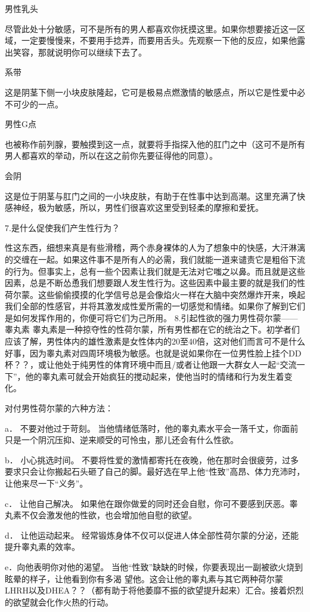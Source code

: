 \documentclass[12pt,UTF8]{ctexbook}
\begin{document}
男性乳头

尽管此处十分敏感，可不是所有的男人都喜欢你抚摸这里。如果你想要接近这一区域，一定要慢慢来，不要用手捻弄，而要用舌头。先观察一下他的反应，如果他露出笑容，那就说明你可以继续下去了。

系带

这是阴茎下侧一小块皮肤隆起，它可是极易点燃激情的敏感点，所以它是性爱中必不可少的一点。

男性G点

也被称作前列腺，要触摸到这一点，就要将手指探入他的肛门之中（这可不是所有男人都喜欢的举动，所以在这之前你先要征得他的同意）。

会阴

这是位于阴茎与肛门之间的一小块皮肤，有助于在性事中达到高潮。这里充满了快感神经，极为敏感，所以，男性们很喜欢这里受到轻柔的摩擦和爱抚。

7.是什么促使我们产生性行为？

性这东西，细想来真是有些滑稽，两个赤身裸体的人为了想象中的快感，大汗淋漓的交缠在一起。如果这件事不是所有人的必需，我们就能一道来谴责它是粗俗下流的行为。但事实上，总有一些个因素让我们就是无法对它嗤之以鼻。而且就是这些因素，总是不断怂恿我们想要跟人发生性行为。这些因素中最主要的就是我们的性荷尔蒙。这些偷偷摸摸的化学信号总是会像焰火一样在大脑中突然爆炸开来，唤起我们全部的性感官，并将其激发成性爱所需的一切感觉和情绪。如果你了解到它们是如何发挥作用的，你便可将它们为己所用。
8.引起性欲的强力男性荷尔蒙——睾丸素
睾丸素是一种掠夺性的性荷尔蒙，所有男性都在它的统治之下。初学者们应该了解，男性体内的雄性激素是女性体内的20至40倍，这对他们而言可不是什么好事，因为睾丸素对四周环境极为敏感。也就是说如果你在一位男性脸上挂个DD杯？？，或让他处于纯男性的体育环境中而且/或者让他跟一大群女人一起“交流一下”，他的睾丸素可就会开始疯狂的搅动起来，使他当时的情绪和行为发生着变化。

对付男性荷尔蒙的六种方法：

a． 不要对他过于苛刻。
当他情绪低落时，他的睾丸素水平会一落千丈，你面前只是一个阴沉压抑、逆来顺受的可怜虫，那儿还会有什么性欲。

b． 小心挑选时间。
不要将性爱的激情都寄托在夜晚，他在那时会很疲劳，过多要求只会让你搬起石头砸了自己的脚。最好选在早上他“性致”高昂、体力充沛时，让他来尽一下“义务”。

c． 让他自己解决。
如果他在跟你做爱的同时还会自慰，你可不要感到厌恶。睾丸素不仅会激发他的性欲，也会增加他自慰的欲望。

d． 让他运动起来。
经常锻炼身体不仅可以促进人体全部性荷尔蒙的分泌，还能提升睾丸素的效率。

e．向他表明你对他的渴望。
当他“性致”缺缺的时候，你要表现出一副被欲火烧到眩晕的样子，让他看到你有多渴 望他。这会让他的睾丸素与其它两种荷尔蒙LHRH以及DHEA？？（都有助于将他萎靡不振的欲望提升起来）汇合。接着炽烈的欲望就会化作火热的行动。
\end{document}
